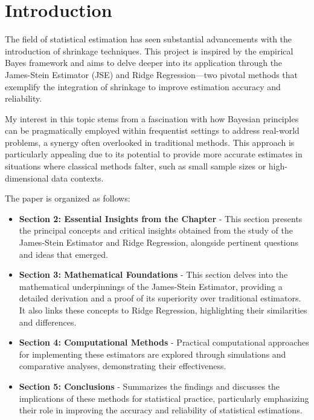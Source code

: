 \section{Introduction} %

The field of statistical estimation has seen substantial advancements with the introduction of shrinkage techniques. This project is inspired by the empirical Bayes framework and aims to delve deeper into its application through the James-Stein Estimator (JSE) and Ridge Regression—two pivotal methods that exemplify the integration of shrinkage to improve estimation accuracy and reliability.

My interest in this topic stems from a fascination with how Bayesian principles can be pragmatically employed within frequentist settings to address real-world problems, a synergy often overlooked in traditional methods. This approach is particularly appealing due to its potential to provide more accurate estimates in situations where classical methods falter, such as small sample sizes or high-dimensional data contexts.

The paper is organized as follows:

\begin{itemize}
    \item \textbf{Section 2: Essential Insights from the Chapter} - This section presents the principal concepts and critical insights obtained from the study of the James-Stein Estimator and Ridge Regression, alongside pertinent questions and ideas that emerged.
    \item \textbf{Section 3: Mathematical Foundations} - This section delves into the mathematical underpinnings of the James-Stein Estimator, providing a detailed derivation and a proof of its superiority over traditional estimators. It also links these concepts to Ridge Regression, highlighting their similarities and differences.
    \item \textbf{Section 4: Computational Methods} - Practical computational approaches for implementing these estimators are explored through simulations and comparative analyses, demonstrating their effectiveness.
    \item \textbf{Section 5: Conclusions} - Summarizes the findings and discusses the implications of these methods for statistical practice, particularly emphasizing their role in improving the accuracy and reliability of statistical estimations.
\end{itemize}